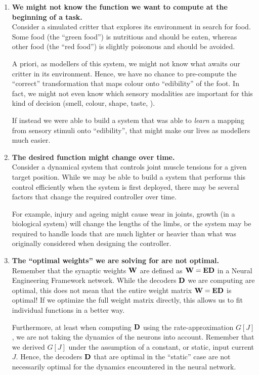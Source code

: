 \documentclass[10pt,letterpaper,oneside]{article}
\begin{document}
\begin{enumerate}[1.]
	\item \textbf{We might not know the function we want to compute at the beginning of a task.}\\
	Consider a simulated critter that explores its environment in search for food. Some food (the \enquote{green food}) is nutritious and should be eaten, whereas other food (the \enquote{red food}) is slightly poisonous and should be avoided.
	
	A priori, as modellers of this system, we might not know what awaits our critter in its environment. Hence, we have no chance to pre-compute the \enquote{correct} transformation that maps colour onto \enquote{edibility} of the foot. In fact, we might not even know which sensory modalities are important for this kind of decision (smell, colour, shape, taste, \textellipsis).

	If instead we were able to build a system that was able to \emph{learn} a mapping from sensory stimuli onto \enquote{edibility}, that might make our lives as modellers much easier.

	\item \textbf{The desired function might change over time.}\\
	Consider a dynamical system that controls joint muscle tensions for a given target position. While we may be able to build a system that performs this control efficiently when the system is first deployed, there may be several factors that change the required controller over time.

	For example, injury and ageing might cause wear in joints, growth (in a biological system) will change the lengths of the limbs, or the system may be required to handle loads that are much lighter or heavier than what was originally considered when designing the controller.

	\item \textbf{The \enquote{optimal weights} we are solving for are not optimal.}\\
	Remember that the synaptic weights ${\mathbf{W}}$ are defined as ${\mathbf{W}} = {\mathbf{E}} {\mathbf{D}}$ in a Neural Engineering Framework network. While the decoders ${\mathbf{D}}$ we are computing are optimal, this does not mean that the entire weight matrix ${\mathbf{W}} = {\mathbf{E}} {\mathbf{D}}$ is optimal! If we optimize the full weight matrix directly, this allows us to fit individual functions in a better way.
	
	Furthermore, at least when computing ${\mathbf{D}}$ using the rate-approximation $G[J]$, we are not taking the dynamics of the neurons into account. Remember that we derived $G[J]$ under the assumption of a constant, or static, input current $J$. Hence, the decoders ${\mathbf{D}}$ that are optimal in the \enquote{static} case are not necessarily optimal for the dynamics encountered in the neural network.


\end{enumerate}
\end{document}
